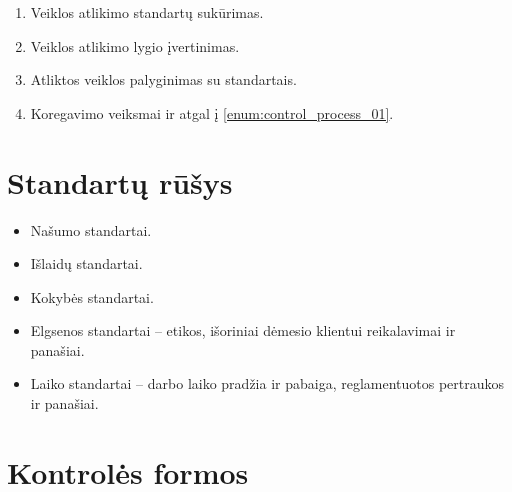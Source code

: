 \begin{enumerate}
  \item \label{enum:control_process_01} Veiklos atlikimo standartų
    sukūrimas.
  \item Veiklos atlikimo lygio įvertinimas.
  \item Atliktos veiklos palyginimas su standartais.
  \item Koregavimo veiksmai ir atgal į \ref{enum:control_process_01}.
\end{enumerate}

\section{Standartų rūšys}

\begin{itemize}
  \item Našumo standartai.
  \item Išlaidų standartai.
  \item Kokybės standartai.
  \item Elgsenos standartai – etikos, išoriniai dėmesio klientui
    reikalavimai ir panašiai.
  \item Laiko standartai – darbo laiko pradžia ir pabaiga, reglamentuotos
    pertraukos ir panašiai.
\end{itemize}

\section{Kontrolės formos}

